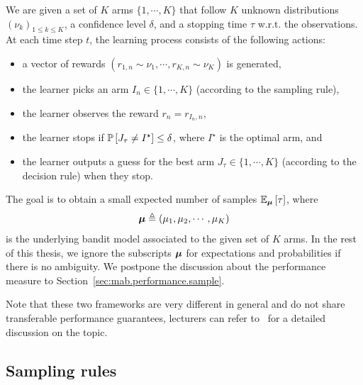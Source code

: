 \begin{definition}\label{def:mab.bai_confidence}
\begin{leftbar}[defnbar]
	We are given a set of $K$ arms $\{1,\cdots,K\}$ that follow $K$ unknown distributions $(\nu_k)_{1 \leq k \leq K}$, a confidence level $\delta$, and a stopping time $\tau$ w.r.t. the observations. At each time step $t$, the learning process consists of the following actions:
\begin{itemize}
	\item a vector of rewards $(r_{1,n} \sim \nu_1, \cdots, r_{K,n} \sim \nu_K)$ is generated,
	\item the learner picks an arm $I_n \in \{1,\cdots,K\}$ (according to the sampling rule),
	\item the learner observes the reward $r_n = r_{I_n, n}$,
	\item the learner stops if $\mathbb{P}\left[J_{\tau}\neq I^\star\right] \leq \delta$, where $I^\star$ is the optimal arm, and
	\item the learner outputs a guess for the best arm $J_\tau \in \{1,\cdots,K\}$ (according to the decision rule) when they stop.
\end{itemize}
\end{leftbar}
\end{definition}

The goal is to obtain a small expected number of samples $\mathbb{E}_{{\boldsymbol \mu}}\left[\tau\right]$, where 
\[
    {\boldsymbol \mu}\triangleq(\mu_1,\mu_2,\cdots,\mu_K)
\]
is the underlying bandit model associated to the given set of $K$ arms. In the rest of this thesis, we ignore the subscripts ${\boldsymbol \mu}$ for expectations and probabilities if there is no ambiguity. We postpone the discussion about the performance measure to Section~\ref{sec:mab.performance.sample}.

\begin{remark}
\begin{leftbar}[remarkbar]
Note that these two frameworks are very different in general and do not share transferable performance guarantees, lecturers can refer to~\cite{carpentier2016budget} for a detailed discussion on the topic.
\end{leftbar}
\end{remark}

\subsection{Sampling rules}\label{sec:mab.bai.sampling}

